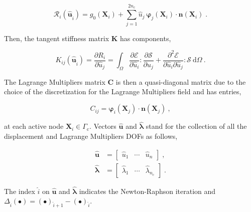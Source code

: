 \documentclass[10pt,a4paper]{article}
\begin{document}
\begin{equation}
	\mathcal{R}_i ( \hat{\mathbf{u}}_{\hat{i}} ) = g_0(\mathbf{X}_i) + \sum_{j = 1}^{2 n_{\text{c}}} \hat{u}_j \, \boldsymbol{\varphi}_j (\mathbf{X}_i) \cdot \mathbf{n}(\mathbf{X}_i) \;.
\end{equation}

Then, the tangent stiffness matrix $\mathbf{K}$ has components,

\begin{equation}
	K_{ij} ( \hat{\mathbf{u}}_{\hat{i}} ) = \frac{\partial R_i}{\partial \hat{u}_j} = \int_{\Omega} \frac{\partial \boldsymbol{\mathcal{E}}}{\partial \hat{u}_i} : \frac{\partial \boldsymbol{\mathcal{S}}}{\partial \hat{u}_j} + \frac{\partial^2 \boldsymbol{\mathcal{E}}}{\partial \hat{u}_i \partial \hat{u}_j} : \boldsymbol{\mathcal{S}} \: \text{d} \Omega \:. \label{eq:tangent_stiffness_matrix}
\end{equation}

The Lagrange Multipliers matrix $\mathbf{C}$ is then a quasi-diagonal matrix due to the choice of the discretization for the Lagrange Multipliers field and has entries,

\begin{equation}
	C_{ij} =  \boldsymbol{\varphi}_i (\mathbf{X}_j) \cdot \mathbf{n}(\mathbf{X}_j) \:,	\label{eq:lagrange_multipliers_matrix}
\end{equation}

at each active node $\mathbf{X}_i \in \Gamma_{\text{c}}$. Vectors $\hat{\mathbf{u}}$ and $\hat{\boldsymbol{\lambda}}$ stand for the collection of all the displacement and Lagrange Multipliers DOFs as follows,

\begin{subequations}
	\begin{alignat}{1}
		\hat{\mathbf{u}} &= \left[ \begin{array}{ccc} \hat{u}_1 & \cdots & \hat{u}_n \end{array} \right] \;, \label{eq:vector_of_displacement_dofs} \\
		\boldsymbol{\hat{\boldsymbol{\lambda}}} &= \left[ \begin{array}{ccc} \hat{\lambda}_1 & \cdots & \hat{\lambda}_{n_{\text{c}}} \end{array} \right] \;. \label{eq:vector_of_lagrange_multipliers_dofs}
	\end{alignat}
	\label{eq:vectors_of_dofs}
\end{subequations}

The index $\hat{i}$ on $\hat{\mathbf{u}}$ and $\hat{\boldsymbol{\lambda}}$ indicates the Newton-Raphson iteration and $\Delta_{\hat{i}} (\bullet) = (\bullet)_{\hat{i} + 1} - (\bullet)_{\hat{i}}$.
\end{document}
